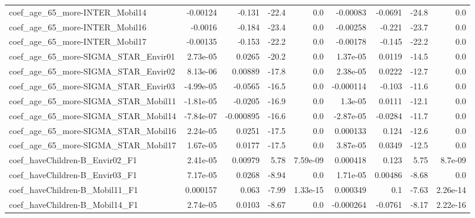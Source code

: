 \begin{tabular}{lrrrrrrrr}
coef\_age\_65\_more-INTER\_Mobil14            &    -0.00124 &       -0.131 &   -22.4 &      0.0 &   -0.00083 &     -0.0691 &        -24.8 &           0.0 \\
coef\_age\_65\_more-INTER\_Mobil16            &     -0.0016 &       -0.184 &   -23.4 &      0.0 &   -0.00258 &      -0.221 &        -23.7 &           0.0 \\
coef\_age\_65\_more-INTER\_Mobil17            &    -0.00135 &       -0.153 &   -22.2 &      0.0 &   -0.00178 &      -0.145 &        -22.2 &           0.0 \\
coef\_age\_65\_more-SIGMA\_STAR\_Envir01       &    2.73e-05 &       0.0265 &   -20.2 &      0.0 &   1.37e-05 &      0.0119 &        -14.5 &           0.0 \\
coef\_age\_65\_more-SIGMA\_STAR\_Envir02       &    8.13e-06 &      0.00889 &   -17.8 &      0.0 &   2.38e-05 &      0.0222 &        -12.7 &           0.0 \\
coef\_age\_65\_more-SIGMA\_STAR\_Envir03       &   -4.99e-05 &      -0.0565 &   -16.5 &      0.0 &  -0.000114 &      -0.103 &        -11.6 &           0.0 \\
coef\_age\_65\_more-SIGMA\_STAR\_Mobil11       &   -1.81e-05 &      -0.0205 &   -16.9 &      0.0 &    1.3e-05 &      0.0111 &        -12.1 &           0.0 \\
coef\_age\_65\_more-SIGMA\_STAR\_Mobil14       &   -7.84e-07 &    -0.000895 &   -16.6 &      0.0 &  -2.87e-05 &     -0.0284 &        -11.7 &           0.0 \\
coef\_age\_65\_more-SIGMA\_STAR\_Mobil16       &    2.24e-05 &       0.0251 &   -17.5 &      0.0 &   0.000133 &       0.124 &        -12.6 &           0.0 \\
coef\_age\_65\_more-SIGMA\_STAR\_Mobil17       &    1.67e-05 &       0.0177 &   -17.5 &      0.0 &   3.87e-05 &      0.0349 &        -12.5 &           0.0 \\
coef\_haveChildren-B\_Envir02\_F1            &    2.41e-05 &      0.00979 &    5.78 & 7.59e-09 &   0.000418 &       0.123 &         5.75 &       8.7e-09 \\
coef\_haveChildren-B\_Envir03\_F1            &    7.17e-05 &       0.0268 &   -8.94 &      0.0 &   1.71e-05 &     0.00486 &        -8.68 &           0.0 \\
coef\_haveChildren-B\_Mobil11\_F1            &    0.000157 &        0.063 &   -7.99 & 1.33e-15 &   0.000349 &         0.1 &        -7.63 &      2.26e-14 \\
coef\_haveChildren-B\_Mobil14\_F1            &    2.74e-05 &       0.0103 &   -8.67 &      0.0 &  -0.000264 &     -0.0761 &        -8.17 &      2.22e-16 \\

\end{tabular}
